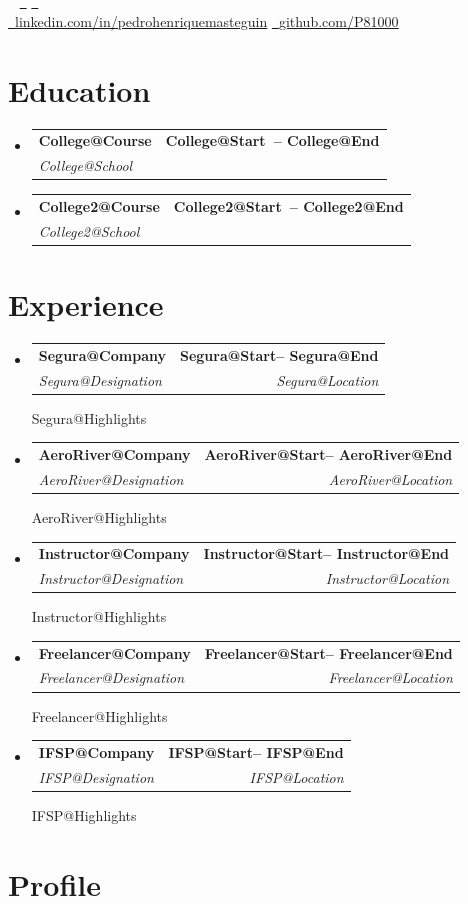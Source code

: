 \documentclass[letterpaper,11pt]{article}
\makeatletter
\newcommand{\resumeSubheading}[4]{
  \vspace{-2pt}\item
    \begin{tabular*}{1.0\textwidth}[t]{l@{\extracolsep{\fill}}r}
      \textbf{#1} & \textbf{\small #2} \\
      \textit{\small#3} & \textit{\small #4} \\
    \end{tabular*}\vspace{-7pt}
}
\newcommand{\resumeSubHeadingListStart}{\begin{itemize}[leftmargin=0.0in, label={}]}
\newcommand{\resumeSubHeadingListEnd}{\end{itemize}}
\def\titlesection{
\begin{center}
    {\Huge \scshape \firstname \ \lastname} \\ \vspace{5pt}
    \small \profile \\ \vspace{5pt}
    \small 
    \faPhone\ \jasphone \hspace{10pt} %
    \href{mailto:\email}{\faEnvelope\ \underline{\email}} \hspace{10pt}
    \href{mailto:\mail}{\faEnvelope\ \underline{\mail}} \\ \vspace{3pt}
    \href{\linkedin}{\faLinkedin\ \underline{linkedin.com/in/pedrohenriquemasteguin}} \hspace{10pt}
    \href{\github}{\faGithub\ \underline{github.com/P81000}}
    \vspace{-8pt}
\end{center}
}
\makeatother
\begin{document}
\titlesection

\section{Education}
  \resumeSubHeadingListStart
      \resumeSubheading{\csname College@Course\endcsname}
      {\csname College@Start\endcsname \ -- \csname College@End\endcsname}
      {\csname College@School\endcsname}{}
      \resumeSubheading{\csname College2@Course\endcsname}
      {\csname College2@Start\endcsname \ -- \csname College2@End\endcsname}
      {\csname College2@School\endcsname}{}
  \resumeSubHeadingListEnd

\newcommand{\renderExp}[1]{
\resumeSubheading
      {\csname #1@Company\endcsname}{\csname #1@Start\endcsname -- \csname #1@End\endcsname}
      {\csname #1@Designation\endcsname}{\csname #1@Location\endcsname}
      \csname #1@Highlights\endcsname
}

\section{Experience}
    \resumeSubHeadingListStart
        \renderExp{Segura}
        \renderExp{AeroRiver}
        \renderExp{Instructor}
        \renderExp{Freelancer}
        \renderExp{IFSP}  
  \resumeSubHeadingListEnd

\section{Profile}
\begin{justify}
    \resume
\end{justify}

    
\end{document}
